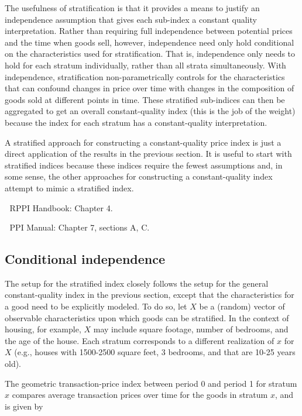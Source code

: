\documentclass[]{article}
\begin{document}
The usefulness of stratification is that it provides a means to justify an independence assumption that gives each sub-index a constant quality interpretation. Rather than requiring full independence between potential prices and the time when goods sell, however, independence need only hold conditional on the characteristics used for stratification. That is, independence only needs to hold for each stratum individually, rather than all strata simultaneously. With independence, stratification non-parametrically controls for the characteristics that can confound changes in price over time with changes in the composition of goods sold at different points in time. These stratified sub-indices can then be aggregated to get an overall constant-quality index (this is the job of the weight) because the index for each stratum has a constant-quality interpretation.

A stratified approach for constructing a constant-quality price index is just a direct application of the results in the previous section. It is useful to start with stratified indices because these indices require the fewest assumptions and, in some sense, the other approaches for constructing a constant-quality index attempt to mimic a stratified index.

📖 RPPI Handbook: Chapter 4.

📖 PPI Manual: Chapter 7, sections A, C.

\hypertarget{conditional-independence}{%
\subsection{Conditional independence}\label{conditional-independence}}

The setup for the stratified index closely follows the setup for the general constant-quality index in the previous section, except that the characteristics for a good need to be explicitly modeled. To do so, let \(X\) be a (random) vector of observable characteristics upon which goods can be stratified. In the context of housing, for example, \(X\) may include square footage, number of bedrooms, and the age of the house. Each stratum corresponds to a different realization of \(x\) for \(X\) (e.g., houses with 1500-2500 square feet, 3 bedrooms, and that are 10-25 years old).

The geometric transaction-price index between period 0 and period 1 for stratum \(x\) compares average transaction prices over time for the goods in stratum \(x\), and is given by
\end{document}

